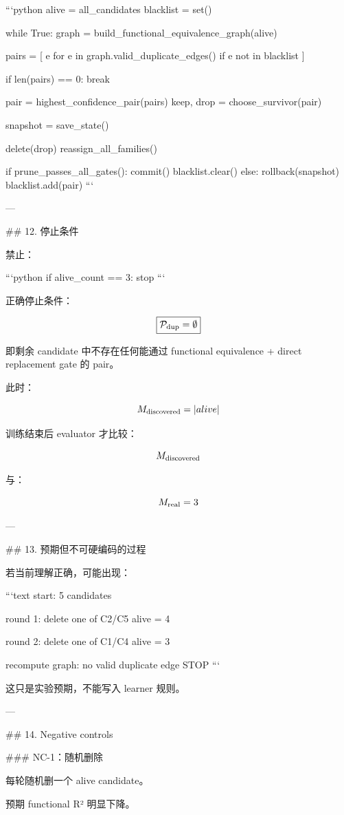 ```python
alive = all_candidates
blacklist = set()

while True:
    graph = build_functional_equivalence_graph(alive)

    pairs = [
        e for e in graph.valid_duplicate_edges()
        if e not in blacklist
    ]

    if len(pairs) == 0:
        break

    pair = highest_confidence_pair(pairs)
    keep, drop = choose_survivor(pair)

    snapshot = save_state()

    delete(drop)
    reassign_all_families()

    if prune_passes_all_gates():
        commit()
        blacklist.clear()
    else:
        rollback(snapshot)
        blacklist.add(pair)
```

---

## 12. 停止条件

禁止：

```python
if alive_count == 3:
    stop
```

正确停止条件：

\[
\boxed{
\mathcal P_{\rm dup}=\emptyset
}
\]

即剩余 candidate 中不存在任何能通过 functional equivalence + direct replacement gate 的 pair。

此时：

\[
M_{\rm discovered}=|alive|
\]

训练结束后 evaluator 才比较：

\[
M_{\rm discovered}
\]

与：

\[
M_{\rm real}=3
\]

---

## 13. 预期但不可硬编码的过程

若当前理解正确，可能出现：

```text
start: 5 candidates

round 1:
delete one of C2/C5
alive = 4

round 2:
delete one of C1/C4
alive = 3

recompute graph:
no valid duplicate edge
STOP
```

这只是实验预期，不能写入 learner 规则。

---

## 14. Negative controls

### NC-1：随机删除

每轮随机删一个 alive candidate。

预期 functional R² 明显下降。

